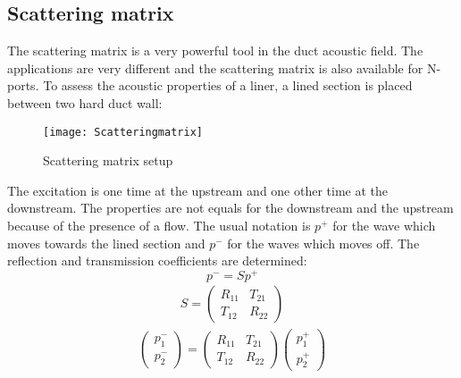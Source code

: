 \subsection{Scattering matrix}
The scattering matrix is a very powerful tool in the duct acoustic field. The applications are very different and the scattering matrix is also available for N-ports. To assess the acoustic properties of a liner, a lined section is placed between two hard duct wall: 
\begin{figure}[H] \centering
    \label{Scatteringmatrix}
    \texttt{[image: Scatteringmatrix]}
    \caption{Scattering matrix setup}
\end{figure}
The excitation is one time at the upstream and one other time at the downstream. The properties are not equals for the downstream and the upstream because of the presence of a flow. The usual notation is $p^+$ for the wave which moves towards the lined section and $p^-$ for the waves which moves off.
The reflection and transmission coefficients are determined:
\begin{equation}
    p^-=Sp^+
\end{equation}
\begin{gather}
    S=
    \begin{pmatrix}
      R_{11} & T_{21} \\
      T_{12} & R_{22} 
    \end{pmatrix}
\end{gather}
\begin{gather}
    \begin{pmatrix}
      p_1^- \\
      p_2^- 
    \end{pmatrix}
    =
    \begin{pmatrix}
      R_{11} & T_{21} \\
      T_{12} & R_{22} 
    \end{pmatrix}
    \begin{pmatrix}
      p_1^+ \\
      p_2^+ 
    \end{pmatrix}
 \end{gather}
 
